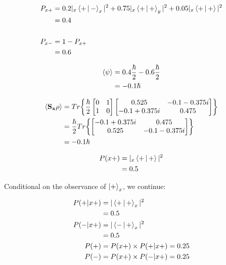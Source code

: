 \documentclass[12pt]{article}
\begin{document}
\problemasub
\begin{align*}
    P_{x+} &= 0.2 |{}_x\Braket{+|-}_x|^2 + 0.75 |{}_x\Braket{+|+}_y|^2 + 0.05 |{}_x\Braket{+|+}|^2 \\
           &= 0.4 \\ \\
    P_{x-} &= 1 - P_{x+} \\
           &= 0.6
\end{align*}

\problemasub
\begin{align*}
    \Braket{\psi} &= 0.4 \frac{\hbar}{2} - 0.6 \frac{\hbar}{2} \\
                  &= -0.1 \hbar
\end{align*}

\problemasub
\begin{align*}
    \Braket{\mathbf{S_x} \rho} &= Tr \biggl\{ \frac{\hbar}{2} \begin{bmatrix}0&1\\1&0\end{bmatrix} \begin{bmatrix}0.525&-0.1-0.375i\\-0.1+0.375i&0.475\end{bmatrix} \biggr\} \\
                               &= \frac{\hbar}{2} Tr \biggl\{ \begin{bmatrix}-0.1+0.375i&0.475\\0.525&-0.1-0.375i\end{bmatrix} \biggr\} \\
                               &= -0.1 \hbar
\end{align*}

\problem

\begin{align*}
    P(x+) &= |{}_{x}\Braket{+|+}|^2 \\
          &= 0.5
\end{align*}

Conditional on the observance of $\Ket{+}_x$, we continue:

\begin{align*}
    P(+|x+) &= |\Braket{+|+}_x|^2 \\
            &= 0.5 \\
    P(-|x+) &= |\Braket{-|+}_x|^2 \\
            &= 0.5 \\
    P(+) &= P(x+) \times P(+|x+) = 0.25 \\
    P(-) &= P(x+) \times P(-|x+) = 0.25 \\
\end{align*}
\end{document}
